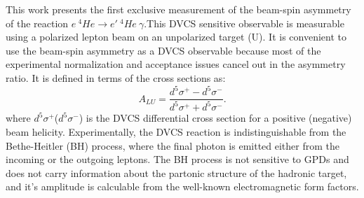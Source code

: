 \documentclass[nofootinbib,twocolumn,showpacs,prl,superscriptaddress,secnumarabic,amssymb,nobibnotes,aps,floatfix]{revtex4}
\begin{document}
This work presents the first exclusive measurement of the beam-spin asymmetry 
of the reaction $e~^{4}He\rightarrow e'~^{4}He~\gamma$.This DVCS sensitive 
observable is measurable using a polarized lepton beam on an unpolarized target 
(U). It is convenient to use the beam-spin asymmetry as a DVCS observable 
because most of the experimental normalization and acceptance issues cancel out 
in the asymmetry ratio. It is defined in terms of the cross sections as:
  \begin{equation}
  A_{LU} = \frac{d^{5}\sigma^{+} - d^{5}\sigma^{-} }
                {d^{5}\sigma^{+} + d^{5}\sigma^{-}}.
    \label{BSA_equation}
  \end{equation}
where $d^{5}\sigma^{+}$($d^{5}\sigma^{-}$) is the DVCS differential cross 
section for a positive (negative) beam helicity. Experimentally, the DVCS 
reaction is indistinguishable from the Bethe-Heitler (BH) process, where the 
final photon is emitted either from the incoming or the outgoing leptons. The 
BH process is not sensitive to GPDs and does not carry information about the 
partonic structure of the hadronic target, and it's amplitude is calculable 
from the well-known electromagnetic form factors.
\end{document}
